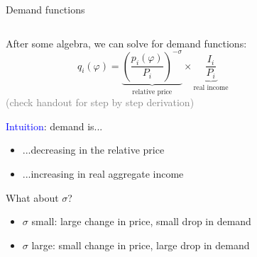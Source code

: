\documentclass[notes,11pt, aspectratio=169, xcolor=table]{beamer}
\newcommand{\blue}[1]{\textcolor{blue}{#1}}
\newenvironment{wideitemize}{\itemize\addtolength{\itemsep}{10pt}}{\enditemize}
\begin{document}
 \begin{frame}{Demand functions}
\begin{columns}
    \begin{column}{0.5\textwidth}
       After some algebra, we can solve for demand functions:            
        \begin{equation*}
            q_i(\varphi) = \underbrace{\left( \frac{p_i(\varphi)}{P_i} \right)^{-\sigma}}_{\text{relative price}} \times \underbrace{\frac{I_i}{P_i}}_{\text{real income}}
            \end{equation*}
        {\scriptsize \qquad \textcolor{gray}{(check handout for step by step derivation)}}

       \begin{wideitemize}
        \item<2-> \blue{Intuition}: demand is...
        \begin{itemize}
            \item ...decreasing in the relative price
            \item ...increasing in real aggregate income
        \end{itemize}        

        \item<3-> What about $\sigma$?
        \begin{itemize}
            \item<4-> $\sigma$ small: large change in price, small drop in demand
            \item<5-> $\sigma$ large: small change in price, large drop in demand
        \end{itemize}
        \end{wideitemize}


    \end{column}
    
    \begin{column}{0.5\textwidth}
\end{column}
\end{columns}
\end{frame}
\end{document}
